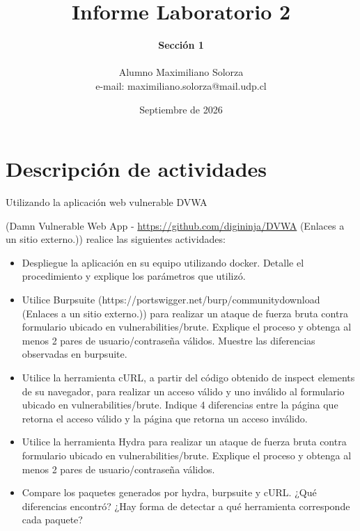 \documentclass[letter,12pt]{article}
\begin{document}
%
   \title{\Huge{Informe Laboratorio 2}}

   \author{\textbf{Sección 1} \\  \\Alumno Maximiliano Solorza \\ e-mail: maximiliano.solorza@mail.udp.cl}

   \date{Septiembre de 2026}

   \maketitle

   \tableofcontents

  \newpage


\section{Descripción de actividades}
Utilizando la aplicación web vulnerable DVWA

(Damn Vulnerable Web App - \href{https://github.com/digininja/DVWA}{https://github.com/digininja/DVWA} (Enlaces a un sitio externo.)) realice las siguientes actividades:


\begin{itemize}
    \item Despliegue la aplicación en su equipo utilizando docker. Detalle el procedimiento y explique los parámetros que utilizó.
    \item Utilice Burpsuite (https://portswigger.net/burp/communitydownload (Enlaces a un sitio externo.)) para realizar un ataque de fuerza bruta contra formulario ubicado en vulnerabilities/brute. Explique el proceso y obtenga al menos 2 pares de usuario/contraseña válidos. Muestre las diferencias observadas en burpsuite.
    \item Utilice la herramienta cURL, a partir del código obtenido de inspect elements de su navegador, para realizar un acceso válido y uno inválido al formulario ubicado en vulnerabilities/brute. Indique 4 diferencias entre la página que retorna el acceso válido y la página que retorna un acceso inválido.
    \item Utilice la herramienta Hydra para realizar un ataque de fuerza bruta contra formulario ubicado en vulnerabilities/brute. Explique el proceso y obtenga al menos 2 pares de usuario/contraseña válidos.
    \item Compare los paquetes generados por hydra, burpsuite y cURL. ¿Qué diferencias encontró? ¿Hay forma de detectar a qué herramienta corresponde cada paquete?
\end{itemize}
\end{document}
